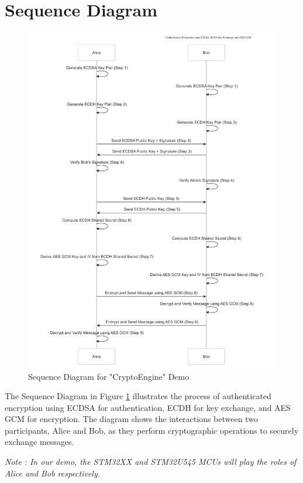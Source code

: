 \section{Sequence Diagram}
\begin{figure}[H]
  \centering
  \includegraphics[width=17cm]{img/numbered auth enc.png}
  \caption{Sequence Diagram for "CryptoEngine" Demo }
  \label{fig:sequence_diagram}
\end{figure}

\hspace{1cm}The Sequence Diagram in Figure \ref{fig:sequence_diagram} illustrates the process of authenticated encryption using ECDSA for authentication, ECDH for key exchange, and AES GCM for encryption. The diagram shows the interactions between two participants, Alice and Bob, as they perform cryptographic operations to securely exchange messages.

\textit{Note : In our demo, the STM32XX and STM32U545 MCUs will play the roles of Alice and Bob respectively.}



